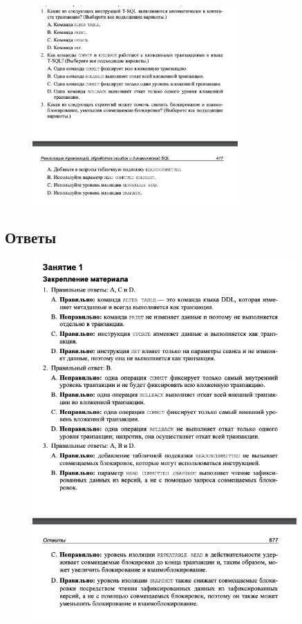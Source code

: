 \begin{figure}[h!]
	\begin{center}
		\includegraphics[width=0.7\textwidth]{img/zakrep23.png}
	\end{center}
	\captionsetup{justification=centering}
\end{figure}
\newpage

\subsection*{Ответы}

\begin{figure}[h!]
	\begin{center}
		\includegraphics[width=0.9\textwidth]{img/ans27.png}
	\end{center}
	\captionsetup{justification=centering}
\end{figure}
\clearpage



